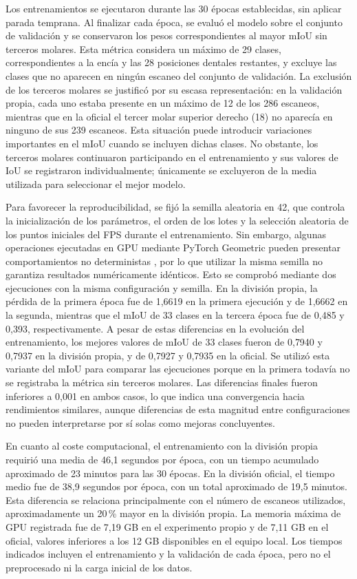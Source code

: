 Los entrenamientos se ejecutaron durante las 30 épocas establecidas, sin aplicar parada temprana. Al finalizar cada época, se evaluó el modelo sobre el conjunto de validación y se conservaron los pesos correspondientes al mayor mIoU sin terceros molares. Esta métrica considera un máximo de 29 clases, correspondientes a la encía y las 28 posiciones dentales restantes, y excluye las clases que no aparecen en ningún escaneo del conjunto de validación. La exclusión de los terceros molares se justificó por su escasa representación: en la validación propia, cada uno estaba presente en un máximo de 12 de los 286 escaneos, mientras que en la oficial el tercer molar superior derecho (18) no aparecía en ninguno de sus 239 escaneos. Esta situación puede introducir variaciones importantes en el mIoU cuando se incluyen dichas clases. No obstante, los terceros molares continuaron participando en el entrenamiento y sus valores de IoU se registraron individualmente; únicamente se excluyeron de la media utilizada para seleccionar el mejor modelo. 

Para favorecer la reproducibilidad, se fijó la semilla aleatoria en 42, que controla la inicialización de los parámetros, el orden de los lotes y la selección aleatoria de los puntos iniciales del FPS durante el entrenamiento. Sin embargo, algunas operaciones ejecutadas en GPU mediante PyTorch Geometric pueden presentar comportamientos no deterministas \cite{feyFastGraphRepresentation2019}, por lo que utilizar la misma semilla no garantiza resultados numéricamente idénticos. Esto se comprobó mediante dos ejecuciones con la misma configuración y semilla. En la división propia, la pérdida de la primera época fue de 1{,}6619 en la primera ejecución y de 1{,}6662 en la segunda, mientras que el mIoU de 33 clases en la tercera época fue de 0{,}485 y 0{,}393, respectivamente. A pesar de estas diferencias en la evolución del entrenamiento, los mejores valores de mIoU de 33 clases fueron de 0{,}7940 y 0{,}7937 en la división propia, y de 0{,}7927 y 0{,}7935 en la oficial. Se utilizó esta variante del mIoU para comparar las ejecuciones porque en la primera todavía no se registraba la métrica sin terceros molares. Las diferencias finales fueron inferiores a 0{,}001 en ambos casos, lo que indica una convergencia hacia rendimientos similares, aunque diferencias de esta magnitud entre configuraciones no pueden interpretarse por sí solas como mejoras concluyentes.

En cuanto al coste computacional, el entrenamiento con la división propia requirió una media de 46{,}1 segundos por época, con un tiempo acumulado aproximado de 23 minutos para las 30 épocas. En la división oficial, el tiempo medio fue de 38{,}9 segundos por época, con un total aproximado de 19{,}5 minutos. Esta diferencia se relaciona principalmente con el número de escaneos utilizados, aproximadamente un 20\,\% mayor en la división propia. La memoria máxima de GPU registrada fue de 7{,}19 GB en el experimento propio y de 7{,}11 GB en el oficial, valores inferiores a los 12 GB disponibles en el equipo local. Los tiempos indicados incluyen el entrenamiento y la validación de cada época, pero no el preprocesado ni la carga inicial de los datos.

